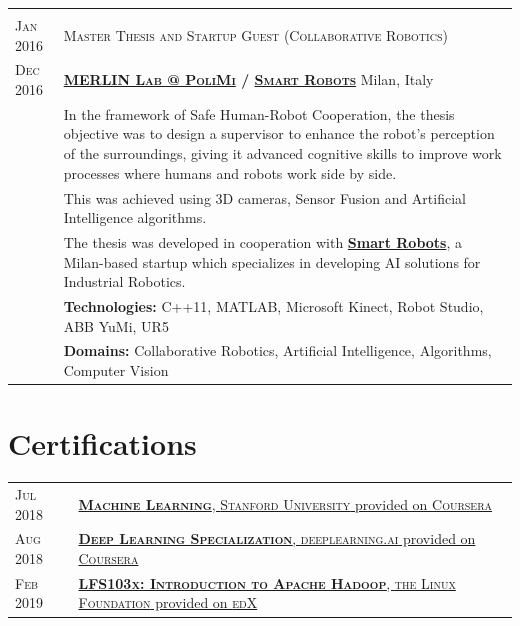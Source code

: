 \documentclass[a4paper,10pt]{article}
\begin{document}
\begin{tabular}{p{1.7cm}|p{15.5cm}}
		\multicolumn{2}{c}{} \\
		\centering\textsc{Jan 2016 } & 
		\textsc{Master Thesis and Startup Guest (Collaborative Robotics)} \\
		\centering\textsc{Dec 2016} &
		\textsc{\textbf{\href{http://merlin.dei.polimi.it/}{MERLIN Lab @ PoliMi} / \href{http://smartrobots.it/en/}{Smart Robots}}} \hfill Milan, Italy\\
		& In the framework of Safe Human-Robot Cooperation, the thesis objective was to design a supervisor to enhance the robot's perception of the surroundings, giving it advanced cognitive skills to improve work processes where humans and robots work side by side.\\
		& This was achieved using 3D cameras, Sensor Fusion and Artificial Intelligence algorithms.\\
		& The thesis was developed in cooperation with \textbf{\href{http://smartrobots.it/en/}{Smart Robots}}, a Milan-based startup which specializes in developing AI solutions for Industrial Robotics.\\
		& \textbf{Technologies:}  C++11, MATLAB, Microsoft Kinect, Robot Studio, ABB YuMi, UR5\\
		& \textbf{Domains:} Collaborative Robotics, Artificial Intelligence, Algorithms, Computer Vision\\
	\end{tabular}

	\section{Certifications}
	\begin{tabular}{p{1.7cm}|p{15.5cm}}
		\centering\textsc{Jul 2018} &
		\href{https://www.coursera.org/account/accomplishments/certificate/PHU5XX9EQ5LP}{\textbf{\textsc{Machine Learning}}, \textsc{Stanford University} provided on \textsc{Coursera}} \\
		
		\centering\textsc{Aug 2018} &
		\href{https://www.coursera.org/account/accomplishments/specialization/certificate/MQRAWL6XD2QW}{\textbf{\textsc{Deep Learning Specialization}}, \textsc{deeplearning.ai} provided on \textsc{Coursera}} \\
		
		\centering\textsc{Feb 2019} &
		\href{https://courses.edx.org/certificates/62fb5163c20048faa605408b3f931718}{\textbf{\textsc{LFS103x: Introduction to Apache Hadoop}}, \textsc{the Linux Foundation} provided on \textsc{edX}} \\
		
	\end{tabular}
\end{document}
